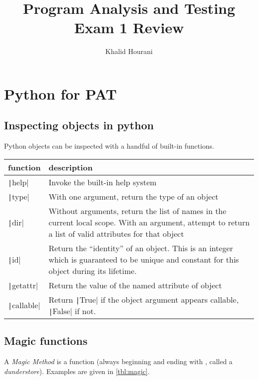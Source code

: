 \documentclass{article}
\title{Program Analysis and Testing\\Exam 1 Review}
\author{Khalid Hourani}
\begin{document}
\maketitle
\section{Python for PAT} 
\subsection{Inspecting objects in python}
Python objects can be inspected with a handful of built-in functions.
\begin{table}
\begin{tabular}{l p{10cm}}
  function & description\\\toprule
  \texttt|help| & Invoke the built-in help system\\\cmidrule{2-2}
  \texttt|type| & With one argument, return the type of an object\\\cmidrule{2-2}
  \texttt|dir| & Without arguments, return the list of names in the current local scope. With an argument, attempt to return a list of valid attributes for that object\\\cmidrule{2-2}
  \texttt|id| & Return the “identity” of an object. This is an integer which is guaranteed to be unique and constant for this object during its lifetime.\\\cmidrule{2-2}
  \texttt|getattr| & Return the value of the named attribute of object\\\cmidrule{2-2}
  \texttt|callable| & Return \texttt|True| if the object argument appears callable, \texttt|False| if not.
\end{tabular}
\end{table}

\subsection{Magic functions}
A \emph{Magic Method} is a function (always beginning and ending with \texttt{\textunderscore\textunderscore},
called a \emph{dunderstore}). Examples are given in \cref{tbl:magic}.
\end{document}
